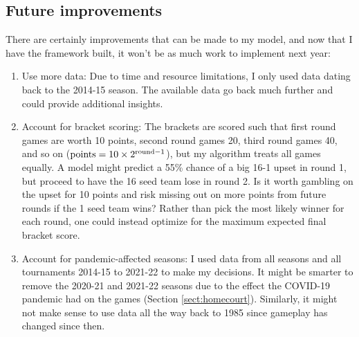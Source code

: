 \documentclass[twocolumn]{aastex63}
\begin{document}
\subsection{Future improvements}
There are certainly improvements that can be made to my model, and now that I have the framework built, it won't be as much work to implement next year:
\begin{enumerate}
\item Use more data: Due to time and resource limitations, I only used data dating back to the 2014-15 season. The available data go back much further and could provide additional insights.
\item Account for bracket scoring: The brackets are scored such that first round games are worth 10 points, second round games 20, third round games 40, and so on (${\rm points} = 10\times 2^{{\rm round}-1}$), but my algorithm treats all games equally. A model might predict a 55\% chance of a big 16-1 upset in round 1, but proceed to have the 16 seed team lose in round 2. Is it worth gambling on the upset for 10 points and risk missing out on more points from future rounds if the 1 seed team wins? Rather than pick the most likely winner for each round, one could instead optimize for the maximum expected final bracket score.
\item Account for pandemic-affected seasons: I used data from all seasons and all tournaments 2014-15 to 2021-22 to make my decisions. It might be smarter to remove the 2020-21 and 2021-22 seasons due to the effect the COVID-19 pandemic had on the games (Section \ref{sect:homecourt}). Similarly, it might not make sense to use data all the way back to 1985 since gameplay has changed since then.
\end{enumerate}
\end{document}
